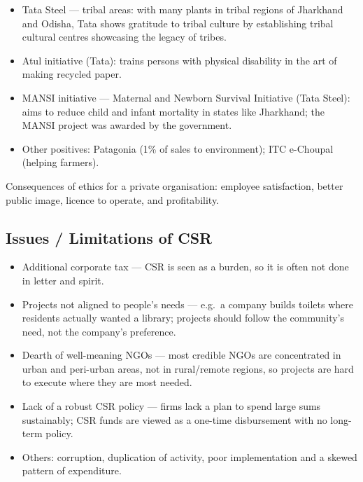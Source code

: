 \begin{ExampleBox}
\begin{itemize}
\item Tata Steel --- tribal areas: with many plants in tribal regions of Jharkhand and Odisha, Tata shows gratitude to tribal culture by establishing tribal cultural centres showcasing the legacy of tribes.
\item Atul initiative (Tata): trains persons with physical disability in the art of making recycled paper.
\item MANSI initiative --- Maternal and Newborn Survival Initiative (Tata Steel): aims to reduce child and infant mortality in states like Jharkhand; the MANSI project was awarded by the government.
\item Other positives: Patagonia (1\% of sales to environment); ITC e-Choupal (helping farmers).
\end{itemize}
\end{ExampleBox}

\begin{KeyConcept}
Consequences of ethics for a private organisation: employee satisfaction, better public image, licence to operate, and profitability.
\end{KeyConcept}

\subsection{Issues / Limitations of CSR}
\begin{itemize}
\item Additional corporate tax --- CSR is seen as a burden, so it is often not done in letter and spirit.
\item Projects not aligned to people's needs --- e.g.\ a company builds toilets where residents actually wanted a library; projects should follow the community's need, not the company's preference.
\item Dearth of well-meaning NGOs --- most credible NGOs are concentrated in urban and peri-urban areas, not in rural/remote regions, so projects are hard to execute where they are most needed.
\item Lack of a robust CSR policy --- firms lack a plan to spend large sums sustainably; CSR funds are viewed as a one-time disbursement with no long-term policy.
\item Others: corruption, duplication of activity, poor implementation and a skewed pattern of expenditure.
\end{itemize}

